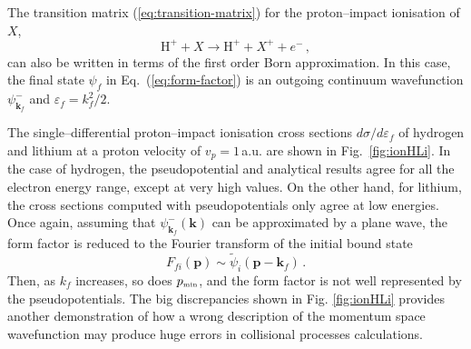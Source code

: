 \documentclass[10pt]{article}
\begin{document}
The transition matrix (\ref{eq:transition-matrix}) for the 
proton--impact ionisation of $X$,
\begin{equation}
 \mbox{H}^+ + X \rightarrow \mbox{H}^+ + X^+ + e^-\,,
\end{equation}
can also be written in terms of the first order Born
approximation. In this case, the final state $\psi_{\!f}$ in 
Eq.~(\ref{eq:form-factor}) is an outgoing continuum 
wavefunction $\psi_{\mathbf{k}_{\!f}}^-$ and $\varepsilon_{\!f}=k_{\!f}^2/2$. 

The single--differential proton--impact ionisation cross sections 
$d\sigma/d\varepsilon_{\!f}$ of hydrogen and lithium at a proton 
velocity of $v_p=1$\,a.u. 
are shown in Fig.~\ref{fig:ionHLi}. 
In the case of hydrogen, the pseudopotential and analytical results
agree for all the electron energy range, except at very high values. 
On the other hand, for lithium, the cross sections computed with 
pseudopotentials only agree at low energies. 
Once again, assuming that $\psi_{\mathbf{k}_{\!f}}^-(\mathbf{k})$ can be 
approximated by a plane wave, the form factor is reduced to the 
Fourier transform of the initial bound state
\begin{equation}
 F_{\!fi}(\mathbf{p})\sim\widetilde{\psi}_i(\mathbf{p}-\mathbf{k}_{\!f})\,.
\end{equation}
Then, as $k_{\!f}$ increases, so does $p_{\mbox{\tiny min}}$, and the form
factor is not well represented by the pseudopotentials. The big 
discrepancies shown in Fig. \ref{fig:ionHLi} provides another demonstration
of how a wrong description of the momentum space wavefunction may
produce huge errors in collisional processes calculations.
\end{document}
